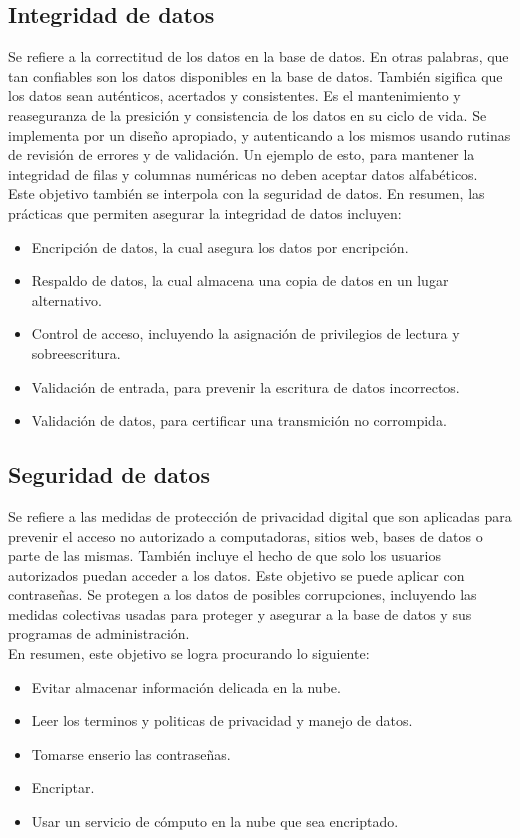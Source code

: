 \documentclass[letterpaper, 12pt]{article}
\begin{document}
\begin{justify}
        \subsection{Integridad de datos}
        \justify
        Se refiere a la correctitud de los datos en la base de datos. En otras palabras, que tan confiables son los datos disponibles en la base de datos. También sigifica que los datos sean auténticos, acertados y consistentes. Es el mantenimiento y reaseguranza
        de la presición y consistencia de los datos en su ciclo de vida. Se implementa por un diseño apropiado, y autenticando a los mismos usando rutinas de revisión de errores y de validación. Un ejemplo de esto, para mantener la integridad de filas y columnas numéricas
        no deben aceptar datos alfabéticos.
        \\\newline
        Este objetivo también se interpola con la seguridad de datos. En resumen, las prácticas que permiten asegurar la integridad de datos incluyen:
        \begin{itemize}
            \item Encripción de datos, la cual asegura los datos por encripción.
            \item Respaldo de datos, la cual almacena una copia de datos en un lugar alternativo.
            \item Control de acceso, incluyendo la asignación de privilegios de lectura y sobreescritura.
            \item Validación de entrada, para prevenir la escritura de datos incorrectos.
            \item Validación de datos, para certificar una transmición no corrompida.
        \end{itemize}
        \subsection{Seguridad de datos}
        \justify
        Se refiere a las medidas de protección de privacidad digital que son aplicadas para prevenir el acceso no autorizado a computadoras, sitios web, bases de datos o parte de las mismas. También incluye el hecho de que solo los usuarios autorizados puedan acceder a los datos. Este objetivo
        se puede aplicar con contraseñas. Se protegen a los datos de posibles corrupciones, incluyendo las medidas colectivas usadas para proteger y asegurar a la base de datos y sus programas de administración.
        \\\newline
        En resumen, este objetivo se logra procurando lo siguiente:
        \begin{itemize}
            \item Evitar almacenar información delicada en la nube.
            \item Leer los terminos y politicas de privacidad y manejo de datos.
            \item Tomarse enserio las contraseñas.
            \item Encriptar.
            \item Usar un servicio de cómputo en la nube que sea encriptado.
        \end{itemize}

\end{justify}
\end{document}
